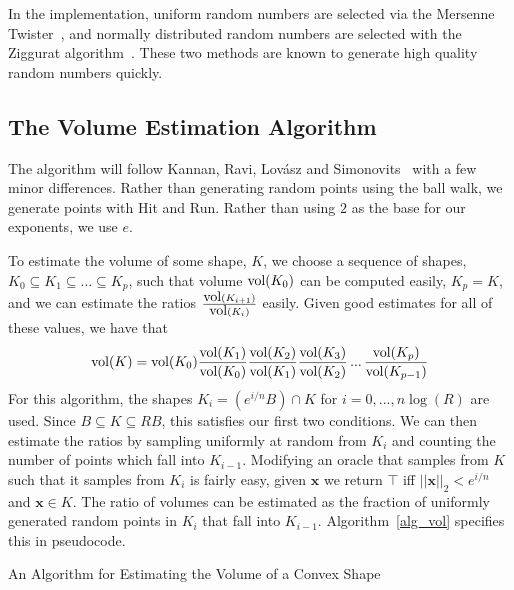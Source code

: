 In the implementation, uniform random numbers are selected via the Mersenne Twister~\cite{Matsumoto98}, and normally distributed random numbers are selected with the Ziggurat algorithm~\cite{Marsaglia00, Burkardt07}. These two methods are known to generate high quality random numbers quickly.

\subsection{The Volume Estimation Algorithm}

The algorithm will follow Kannan, Ravi, Lov\'{a}sz and Simonovits~\cite{Kannan97} with a few minor differences. Rather than generating random points using the ball walk, we generate points with Hit and Run. Rather than using $2$ as the base for our exponents, we use $e$.

To estimate the volume of some shape, $K$, we choose a sequence of shapes, $K_0 \subseteq K_1 \subseteq ... \subseteq K_p$, such that volume $\mbox{vol} (K_0)$ can be computed easily, $K_p = K$, and we can estimate the ratios $\frac{\mbox{vol}(K_{i+1})}{\mbox{vol}(K_i)}$ easily. Given good estimates for all of these values, we have that
$$
\mbox{vol}(K) = \mbox{vol}(K_0) \frac{\mbox{vol}(K_1)}{\mbox{vol}(K_0)} \frac{\mbox{vol}(K_2)}{\mbox{vol}(K_1)} \frac{\mbox{vol}(K_3)}{\mbox{vol}(K_2)} \, ... \, \frac{\mbox{vol}(K_p)}{\mbox{vol}(K_{p-1})}
$$
For this algorithm, the shapes $K_i = (e^{i/n}B) \cap K$ for $i = 0, ..., n \log (R)$ are used. Since $B \subseteq K \subseteq RB$, this satisfies our first two conditions. We can then estimate the ratios by sampling uniformly at random from $K_i$ and counting the number of points which fall into $K_{i-1}$. Modifying an oracle that samples from $K$ such that it samples from $K_i$ is fairly easy, given ${\bm x}$ we return $\top$ iff $||\bm{x}||_2 < e^{i/n}$ and ${\bm x} \in K$. The ratio of volumes can be estimated as the fraction of uniformly generated random points in $K_i$ that fall into $K_{i-1}$. Algorithm~\ref{alg_vol} specifies this in pseudocode.

\begin{algorithm}
\SetAlgoLined
{}

\caption{An Algorithm for Estimating the Volume of a Convex Shape}\label{alg_vol}

\end{algorithm}

